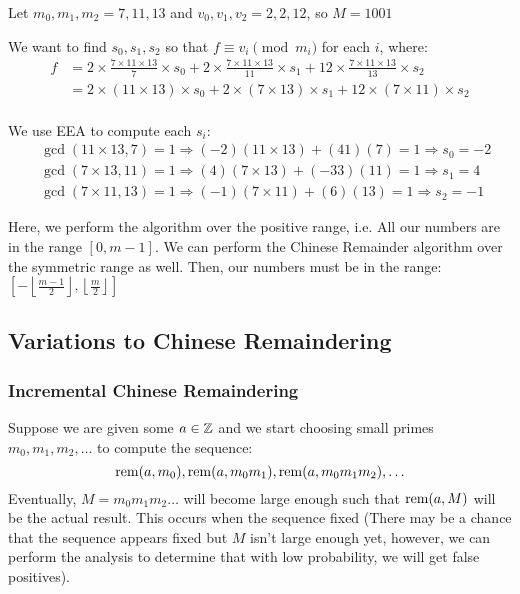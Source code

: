 \begin{example}{}{}
    Let $m_0, m_1, m_2 = 7, 11, 13$ and $v_0, v_1, v_2 = 2, 2, 12$, so $M = 1001$

    We want to find $s_0, s_1, s_2$ so that $f \equiv v_i \pmod{m_i}$ for each $i$, where:
    \begin{align*}
        f &= 2 \times \frac{7 \times 11 \times 13}{7} \times s_0 + 2 \times \frac{7 \times 11 \times 13}{11} \times s_1 + 12 \times \frac{7 \times 11 \times 13}{13} \times s_2 \\
        &= 2 \times (11 \times 13) \times s_0 + 2 \times (7 \times 13) \times s_1 + 12 \times (7 \times 11) \times s_2 \\
    \end{align*}

    We use EEA to compute each $s_i$:
    \begin{align*}
        &\gcd(11 \times 13, 7) = 1 \Rightarrow (-2)(11 \times 13) + (41)(7) = 1 \Rightarrow s_0 = -2 \\
        &\gcd(7 \times 13, 11) = 1 \Rightarrow (4)(7 \times 13) + (-33)(11) = 1 \Rightarrow s_1 = 4 \\
        &\gcd(7 \times 11, 13) = 1 \Rightarrow (-1)(7 \times 11) + (6)(13) = 1 \Rightarrow s_2 = -1    
    \end{align*}
\end{example}

\begin{note}
    Here, we perform the algorithm over the positive range, i.e. All our numbers are in the range $[0, m - 1]$.
    We can perform the Chinese Remainder algorithm over the symmetric range as well.
    Then, our numbers must be in the range: $\left[-\left\lfloor\frac{m-1}{2}\right\rfloor, \left\lfloor\frac{m}{2}\right\rfloor\right]$
\end{note}

\subsection{Variations to Chinese Remaindering}

\subsubsection{Incremental Chinese Remaindering}
Suppose we are given some $a \in \operatorname{\mathbb{Z}}$ and we start choosing small primes $m_0, m_1, m_2, \ldots$ to compute the sequence:
\begin{equation*}
    \operatorname{rem}(a, m_0), \operatorname{rem}(a, m_0m_1), \operatorname{rem}(a, m_0m_1m_2), \ldots
\end{equation*}
Eventually, $M = m_0m_1m_2\ldots$ will become large enough such that $\operatorname{rem}(a, M)$ will be the actual result.
This occurs when the sequence fixed (There may be a chance that the sequence appears fixed but $M$ isn't large enough yet, however, we can perform the analysis to determine that with low probability, we will get false positives).

